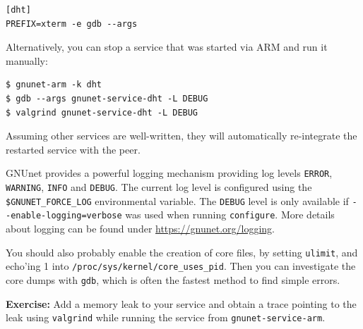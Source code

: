 \documentclass[10pt]{article}
\newcommand{\exercise}[1]{\noindent\begin{boxedminipage}{\textwidth}{\bf Exercise:} #1 \end{boxedminipage}}
\begin{document}
\begin{verbatim}
[dht]
PREFIX=xterm -e gdb --args
\end{verbatim}

Alternatively, you can stop a service that was started via ARM and run it manually:

\lstset{language=bash}
\begin{lstlisting}
$ gnunet-arm -k dht
$ gdb --args gnunet-service-dht -L DEBUG 
$ valgrind gnunet-service-dht -L DEBUG 
\end{lstlisting}

Assuming other services are well-written, they will automatically re-integrate the
restarted service with the peer.

GNUnet provides a powerful logging mechanism providing log levels \texttt{ERROR}, 
\texttt{WARNING}, \texttt{INFO} and \texttt{DEBUG}. The current log level is 
configured using the \lstinline|$GNUNET_FORCE_LOG| environmental variable.
The \texttt{DEBUG} level is only available if \lstinline|--enable-logging=verbose| was used when 
running \texttt{configure}. More details about logging can be found under 
\url{https://gnunet.org/logging}.

You should also probably enable the creation of core files, by setting
{\tt ulimit}, and echo'ing 1 into {\tt /proc/sys/kernel/core\_uses\_pid}.
Then you can investigate the core dumps with {\tt gdb}, which is often
the fastest method to find simple errors.

\exercise{Add a memory leak to your service and obtain a trace
pointing to the leak using {\tt valgrind} while running the service
from {\tt gnunet-service-arm}.}
\end{document}
